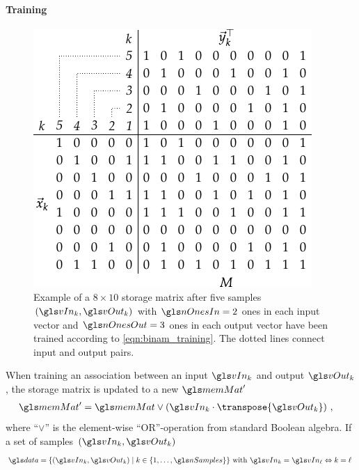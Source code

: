 \paragraph{Training}
\begin{figure}
	\centering
	\includegraphics{media/chp2/binam_training.pdf}
	\caption[BiNAM training example]{Example of a $8 \times 10$ storage matrix \memMat after five samples $(\vIn_k, \vOut_k)$ with $\nOnesIn = 2$ ones in each input vector and $\nOnesOut = 3$ ones in each output vector have been trained according to \cref{eqn:binam_training}. The dotted lines connect input and output pairs.}
	\label{fig:binam_training}
\end{figure}
When training an association between an input $\vIn_k$ and output $\vOut_k$, the storage matrix \memMat is updated to a new \(\memMat'\)
\begin{align}
	\memMat' &= \memMat \vee \left( \vIn_k \cdot \transpose{\vOut_k} \right)\,,
	\label{eqn:binam_update_rule}
\end{align}
where \enquote{$\vee$} is the element-wise \enquote{OR}-operation from standard Boolean algebra. If a set of \nSamples samples \((\vIn_k, \vOut_k)\)
\begin{align}
	\data = \{(\vIn_k, \vOut_k) \mid k \in \{1, \ldots, \nSamples\}\} \text{ with } \vIn_k = \vIn_\ell \Leftrightarrow k = \ell \,
	\label{eqn:binam_data}
\end{align}
